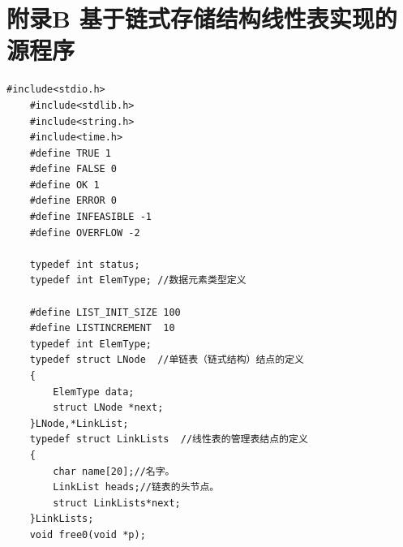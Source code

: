 \documentclass[supercite]{Experimental_Report}
\theoremstyle{definition}
\begin{document}
\section{附录B 基于链式存储结构线性表实现的源程序}
\begin{lstlisting}[title =def,frame=none]
	#include<stdio.h>
	#include<stdlib.h>
	#include<string.h>
	#include<time.h>
	#define TRUE 1
	#define FALSE 0
	#define OK 1
	#define ERROR 0
	#define INFEASIBLE -1
	#define OVERFLOW -2
	
	typedef int status;
	typedef int ElemType; //数据元素类型定义
	
	#define LIST_INIT_SIZE 100
	#define LISTINCREMENT  10
	typedef int ElemType;
	typedef struct LNode  //单链表（链式结构）结点的定义
	{  
		ElemType data;
		struct LNode *next;
	}LNode,*LinkList;
	typedef struct LinkLists  //线性表的管理表结点的定义 
	{
		char name[20];//名字。 
		LinkList heads;//链表的头节点。 
		struct LinkLists*next;
	}LinkLists;
	void free0(void *p);
\end{lstlisting}
\end{document}
